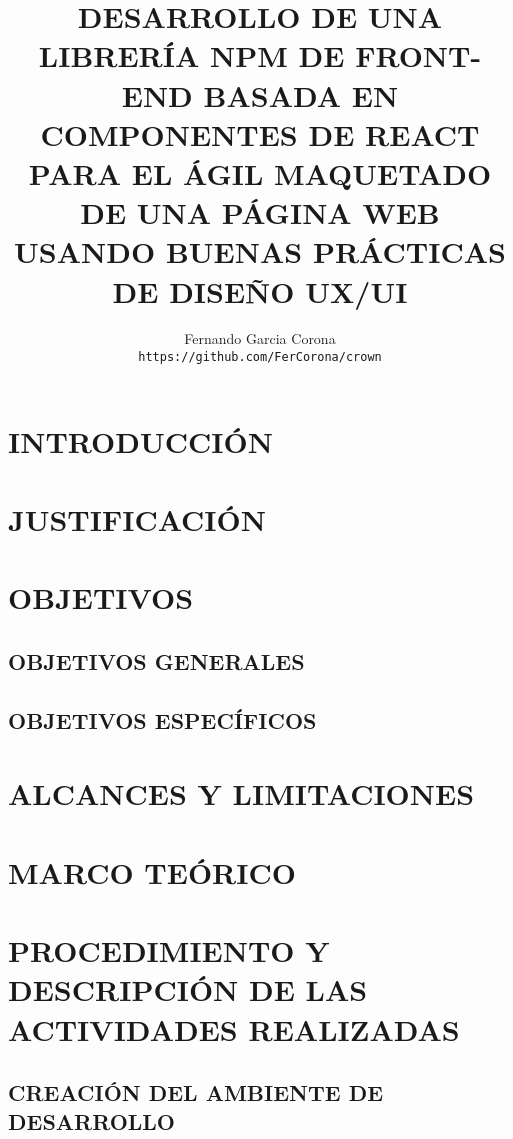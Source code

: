 \documentclass[a4paper,12pt]{report}
\author{
  Fernando Garcia Corona\\
  \texttt{https://github.com/FerCorona/crown}
}
\title{DESARROLLO DE UNA LIBRERÍA NPM DE FRONT-END BASADA EN COMPONENTES DE REACT PARA EL ÁGIL MAQUETADO DE UNA PÁGINA WEB USANDO BUENAS PRÁCTICAS DE DISEÑO UX/UI}
\begin{document}
	\maketitle

	\tableofcontents
	
		\chapter {INTRODUCCIÓN}
			
		\chapter {JUSTIFICACIÓN }
			
		
		\chapter {OBJETIVOS }
			\section {OBJETIVOS GENERALES}
				
			
			\section {OBJETIVOS ESPECÍFICOS} 
				
			
		\chapter {ALCANCES Y LIMITACIONES }
		
		\chapter {MARCO TEÓRICO  }
			
		
		\chapter {PROCEDIMIENTO Y DESCRIPCIÓN DE LAS ACTIVIDADES REALIZADAS}
			
			
			\section {CREACIÓN DEL AMBIENTE DE DESARROLLO}
				
				
\end{document}
